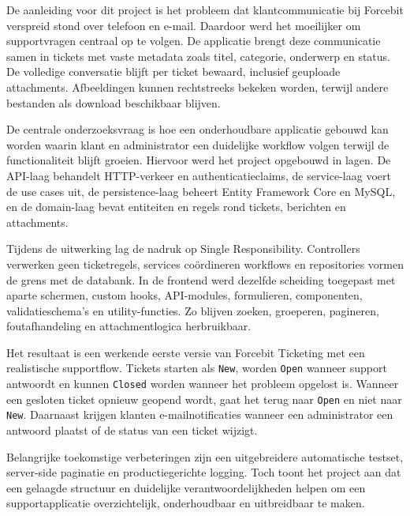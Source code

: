 \smallskip

De aanleiding voor dit project is het probleem dat klantcommunicatie bij Forcebit verspreid stond over telefoon en e-mail. Daardoor werd het moeilijker om supportvragen centraal op te volgen. De applicatie brengt deze communicatie samen in tickets met vaste metadata zoals titel, categorie, onderwerp en status. De volledige conversatie blijft per ticket bewaard, inclusief geuploade attachments. Afbeeldingen kunnen rechtstreeks bekeken worden, terwijl andere bestanden als download beschikbaar blijven.

\smallskip

De centrale onderzoeksvraag is hoe een onderhoudbare applicatie gebouwd kan worden waarin klant en administrator een duidelijke workflow volgen terwijl de functionaliteit blijft groeien. Hiervoor werd het project opgebouwd in lagen. De API-laag behandelt HTTP-verkeer en authenticatieclaims, de service-laag voert de use cases uit, de persistence-laag beheert Entity Framework Core en MySQL, en de domain-laag bevat entiteiten en regels rond tickets, berichten en attachments.

\smallskip

Tijdens de uitwerking lag de nadruk op Single Responsibility. Controllers verwerken geen ticketregels, services coördineren workflows en repositories vormen de grens met de databank. In de frontend werd dezelfde scheiding toegepast met aparte schermen, custom hooks, API-modules, formulieren, componenten, validatieschema's en utility-functies. Zo blijven zoeken, groeperen, pagineren, foutafhandeling en attachmentlogica herbruikbaar.

\smallskip

Het resultaat is een werkende eerste versie van Forcebit Ticketing met een realistische supportflow. Tickets starten als \texttt{New}, worden \texttt{Open} wanneer support antwoordt en kunnen \texttt{Closed} worden wanneer het probleem opgelost is. Wanneer een gesloten ticket opnieuw geopend wordt, gaat het terug naar \texttt{Open} en niet naar \texttt{New}. Daarnaast krijgen klanten e-mailnotificaties wanneer een administrator een antwoord plaatst of de status van een ticket wijzigt.

\smallskip

Belangrijke toekomstige verbeteringen zijn een uitgebreidere automatische testset, server-side paginatie en productiegerichte logging. Toch toont het project aan dat een gelaagde structuur en duidelijke verantwoordelijkheden helpen om een supportapplicatie overzichtelijk, onderhoudbaar en uitbreidbaar te maken.

